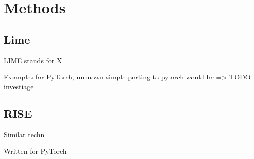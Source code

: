 \chapter{Methods}
\section{Lime}
LIME\cite{todo} stands for X

Examples for PyTorch, unknown simple porting to pytorch would be => TODO investiage

\section{RISE}
Similar techn

Written for PyTorch